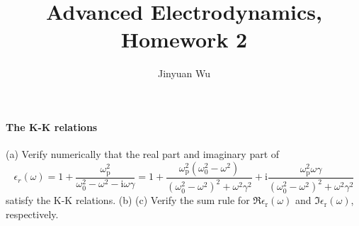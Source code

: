 \documentclass[hyperref, a4paper]{article}
\title{Advanced Electrodynamics, Homework 2}
\author{Jinyuan Wu}
\begin{document}
\maketitle

\paragraph{The K-K relations} (a) Verify numerically that the real part and imaginary part of 
\begin{equation}
    \epsilon_{r}(\omega)=1+\frac{\omega_\text{p}^{2}}{\omega_{0}^{2}-\omega^{2}-\mathrm{i} \omega \gamma}=1+\frac{\omega_\text{p}^{2}\left(\omega_{0}^{2}-\omega^{2}\right)}{\left(\omega_{0}^{2}-\omega^{2}\right)^{2}+\omega^{2} \gamma^{2}}+\mathrm{i} \frac{\omega_\text{p}^{2} \omega \gamma}{\left(\omega_{0}^{2}-\omega^{2}\right)^{2}+\omega^{2} \gamma^{2}}
\end{equation}
satisfy the K-K relations.
(b) 
(c) Verify the sum rule for $\Re \epsilon_\text{r}(\omega)$ and $\Im \epsilon_\text{r}(\omega)$, respectively.
\end{document}
